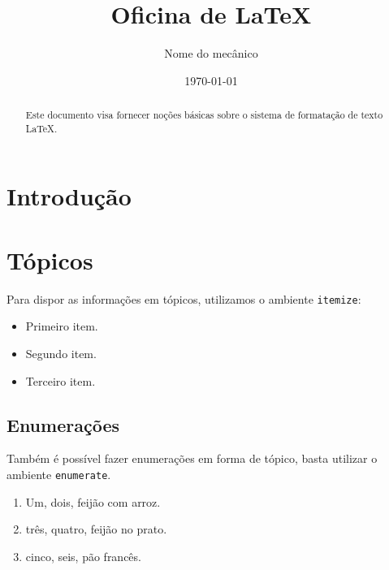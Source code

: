 \documentclass[twocolumn]{article}
\author{Nome do mecânico} %
\date{\today} %
\title{Oficina de \LaTeX} %
\begin{document}
\maketitle %

\begin{abstract}
Este documento visa fornecer noções básicas sobre o sistema de formatação de texto \LaTeX.
\end{abstract}
\section{Introdução}
\lipsum[3]
\section{Tópicos}
Para dispor as informações em tópicos, utilizamos o ambiente {\tt itemize}:
\begin{itemize}
	\item Primeiro item.
	\item Segundo item.
	\item Terceiro item.
\end{itemize}

\subsection{Enumerações}

Também é possível fazer enumerações em forma de tópico, basta utilizar o ambiente {\tt enumerate}.
\begin{enumerate}
	\item Um, dois, feijão com arroz.
	\item três, quatro, feijão no prato.
	\item cinco, seis, pão francês.
\end{enumerate}
\end{document}
